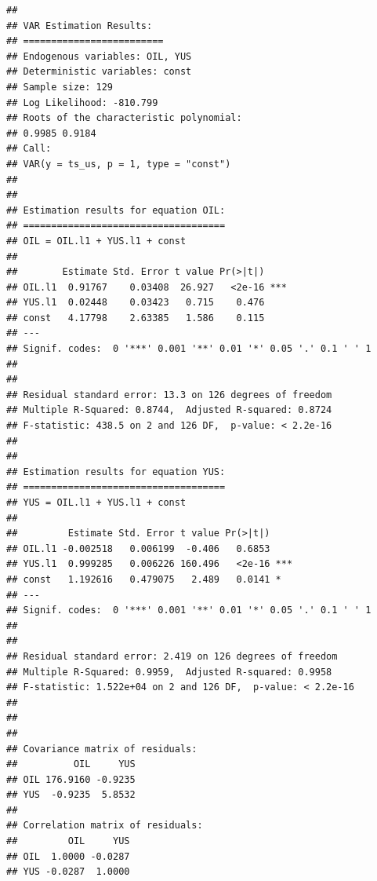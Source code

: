 \documentclass[11pt,preprint, authoryear]{elsarticle}
\numberwithin{equation}{section}
\numberwithin{figure}{section}
\numberwithin{table}{section}
\begin{document}
\begin{verbatim}
## 
## VAR Estimation Results:
## ========================= 
## Endogenous variables: OIL, YUS 
## Deterministic variables: const 
## Sample size: 129 
## Log Likelihood: -810.799 
## Roots of the characteristic polynomial:
## 0.9985 0.9184
## Call:
## VAR(y = ts_us, p = 1, type = "const")
## 
## 
## Estimation results for equation OIL: 
## ==================================== 
## OIL = OIL.l1 + YUS.l1 + const 
## 
##        Estimate Std. Error t value Pr(>|t|)    
## OIL.l1  0.91767    0.03408  26.927   <2e-16 ***
## YUS.l1  0.02448    0.03423   0.715    0.476    
## const   4.17798    2.63385   1.586    0.115    
## ---
## Signif. codes:  0 '***' 0.001 '**' 0.01 '*' 0.05 '.' 0.1 ' ' 1
## 
## 
## Residual standard error: 13.3 on 126 degrees of freedom
## Multiple R-Squared: 0.8744,  Adjusted R-squared: 0.8724 
## F-statistic: 438.5 on 2 and 126 DF,  p-value: < 2.2e-16 
## 
## 
## Estimation results for equation YUS: 
## ==================================== 
## YUS = OIL.l1 + YUS.l1 + const 
## 
##         Estimate Std. Error t value Pr(>|t|)    
## OIL.l1 -0.002518   0.006199  -0.406   0.6853    
## YUS.l1  0.999285   0.006226 160.496   <2e-16 ***
## const   1.192616   0.479075   2.489   0.0141 *  
## ---
## Signif. codes:  0 '***' 0.001 '**' 0.01 '*' 0.05 '.' 0.1 ' ' 1
## 
## 
## Residual standard error: 2.419 on 126 degrees of freedom
## Multiple R-Squared: 0.9959,  Adjusted R-squared: 0.9958 
## F-statistic: 1.522e+04 on 2 and 126 DF,  p-value: < 2.2e-16 
## 
## 
## 
## Covariance matrix of residuals:
##          OIL     YUS
## OIL 176.9160 -0.9235
## YUS  -0.9235  5.8532
## 
## Correlation matrix of residuals:
##         OIL     YUS
## OIL  1.0000 -0.0287
## YUS -0.0287  1.0000
\end{verbatim}
\end{document}
